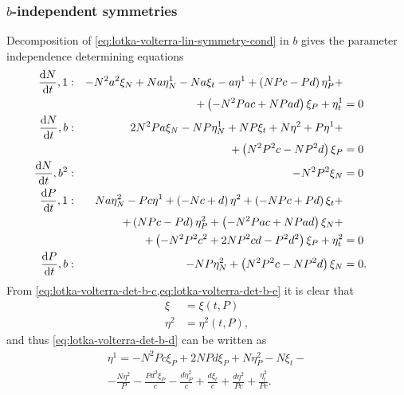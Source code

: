 \subsubsection{\texorpdfstring{\(b\)-independent symmetries}{b-independent symmetries}}

Decomposition of \cref{eq:lotka-volterra-lin-symmetry-cond} in \(b\) gives the parameter independence determining equations
\begin{subequations}\label{eq:lotka-volterra-det-b}
  \begin{flalign}
    \diff{N}{t}, 1 & : & - N^{2} a^{2} \xi_{N} + N a \eta^1_{N} - N a \xi_{t} - a \eta^{1} + \left(N P c - P d\right) \eta^1_{P} +&&&\\&&+ \left(- N^{2} P a c + N P a d\right) \xi_{P} + \eta^1_{t} &= 0 && \FlLabel{eq:lotka-volterra-det-b-a}\\
    \diff{N}{t}, b & : & 2 N^{2} P a \xi_{N} - N P \eta^1_{N} + N P \xi_{t} + N \eta^{2} + P \eta^{1} +&&&\\&&+ \left(N^{2} P^{2} c - N P^{2} d\right) \xi_{P} &= 0 && \FlLabel{eq:lotka-volterra-det-b-b}\\
    \diff{N}{t}, b^2 & : & - N^{2} P^{2} \xi_{N} &= 0 && \FlLabel{eq:lotka-volterra-det-b-c}\\
    \diff{P}{t}, 1 & : & N a \eta^2_{N} - P c \eta^{1} + \left(- N c + d\right) \eta^{2} + \left(- N P c + P d\right) \xi_{t} +&&&\\&&+ \left(N P c - P d\right) \eta^2_{P} + \left(- N^{2} P a c + N P a d\right) \xi_{N} +&&&\\&&+ \left(- N^{2} P^{2} c^{2} + 2 N P^{2} c d - P^{2} d^{2}\right) \xi_{P} + \eta^2_{t} &= 0 && \FlLabel{eq:lotka-volterra-det-b-d}\\
    \diff{P}{t}, b & : & - N P \eta^2_{N} + \left(N^{2} P^{2} c - N P^{2} d\right) \xi_{N} &= 0. && \FlLabel{eq:lotka-volterra-det-b-e}
  \end{flalign}
\end{subequations}
From \cref{eq:lotka-volterra-det-b-c,eq:lotka-volterra-det-b-e} it is clear that
\begin{subequations} \label{eq:lotka-volterra-b-first-simplification}
  \begin{align}
    \xi &= \xi(t, P) \\
    \eta^2 &= \eta^2(t, P),
  \end{align}
\end{subequations}
and thus \cref{eq:lotka-volterra-det-b-d} can be written as
\begin{multline}
  \eta^{1} = - N^{2} P c \xi_{P} + 2 N P d \xi_{P} + N \eta^2_{P} - N \xi_{t} -\\- \frac{N \eta^{2}}{P} - \frac{P d^{2} \xi_{P}}{c} - \frac{d \eta^2_{P}}{c} + \frac{d \xi_{t}}{c} + \frac{d \eta^{2}}{P c} + \frac{\eta^2_{t}}{P c}.
\end{multline}
